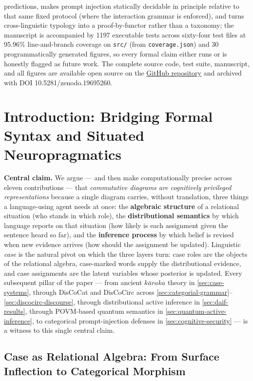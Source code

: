 \documentclass[
]{article}
\begin{document}
predictions, makes prompt injection statically decidable in principle
relative to that same fixed protocol (where the interaction grammar is
enforced), and turns cross-linguistic typology into a proof-by-functor
rather than a taxonomy; the manuscript is accompanied by 1197 executable
tests across sixty-four test files at 95.96\% line-and-branch coverage
on \texttt{src/} (from \texttt{coverage.json}) and 30 programmatically
generated figures, so every formal claim either runs or is honestly
flagged as future work. The complete source code, test suite,
manuscript, and all figures are available open source on the
\href{https://github.com/docxology/cognitive_case_diagrams}{GitHub
repository} and archived with DOI 10.5281/zenodo.19695260.

\newpage

\section{Introduction: Bridging Formal Syntax and Situated
Neuropragmatics}\label{sec:introduction}

\textbf{Central claim.} We argue --- and then make computationally
precise across eleven contributions --- that \emph{commutative diagrams
are cognitively privileged representations} because a single diagram
carries, without translation, three things a language-using agent needs
at once: the \textbf{algebraic structure} of a relational situation (who
stands in which role), the \textbf{distributional semantics} by which
language reports on that situation (how likely is each assignment given
the sentence heard so far), and the \textbf{inference process} by which
belief is revised when new evidence arrives (how should the assignment
be updated). Linguistic \emph{case} is the natural pivot on which the
three layers turn: case roles are the objects of the relational algebra,
case-marked words supply the distributional evidence, and case
assignments are the latent variables whose posterior is updated. Every
subsequent pillar of the paper --- from ancient \(k\bar{a}raka\) theory
in \autoref{sec:case-systems}, through DisCoCat and DisCoCirc across
\autoref{sec:categorial-grammar}--\autoref{sec:discocirc-discourse},
through distributional active inference in \autoref{sec:daif-results},
through POVM-based quantum semantics in
\autoref{sec:quantum-active-inference}, to categorical prompt-injection
defenses in \autoref{sec:cognitive-security} --- is a witness to this
single central claim.

\subsection{Case as Relational Algebra: From Surface Inflection to
Categorical
Morphism}\label{case-as-relational-algebra-from-surface-inflection-to-categorical-morphism}
\end{document}
